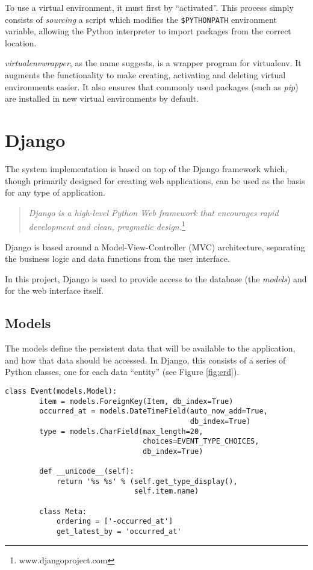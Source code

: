 To use a virtual environment, it must first by ``activated''. This process
simply consists of \emph{sourcing} a script which modifies the
\verb!$PYTHONPATH! environment variable, allowing the Python interpreter to
import packages from the correct location.

\emph{virtualenvwrapper}, as the name suggests, is a wrapper program for
virtualenv. It augments the functionality to make creating, activating and
deleting virtual environments easier. It also ensures that commonly used
packages (such as \emph{pip}) are installed in new virtual environments by
default.

\section{Django}
\label{sec:implementation-django}

The system implementation is based on top of the Django framework which, though
primarily designed for creating web applications, can be used as the basis for
any type of application.

\begin{quote}
    \emph{Django is a high-level Python Web framework that encourages rapid
    development and clean, pragmatic design.}\footnote{www.djangoproject.com}
\end{quote}

Django is based around a Model-View-Controller (MVC) architecture, separating
the business logic and data functions from the user interface.

In this project, Django is used to provide access to the database (the
\emph{models}) and for the web interface itself.

\subsection{Models}
\label{sec:implementation-django-models}

The models define the persistent data that will be available to the
application, and how that data should be accessed. In Django, this consists of
a series of Python classes, one for each data ``entity'' (see Figure
\ref{fig:erd}).

\begin{singlespacing}
\begin{lstlisting}[caption=The `Event' model, label=lst:event-model]
    class Event(models.Model):
        item = models.ForeignKey(Item, db_index=True)
        occurred_at = models.DateTimeField(auto_now_add=True,
                                           db_index=True)
        type = models.CharField(max_length=20,
                                choices=EVENT_TYPE_CHOICES,
                                db_index=True)

        def __unicode__(self):
            return '%s %s' % (self.get_type_display(),
                              self.item.name)

        class Meta:
            ordering = ['-occurred_at']
            get_latest_by = 'occurred_at'
\end{lstlisting}
\end{singlespacing}

